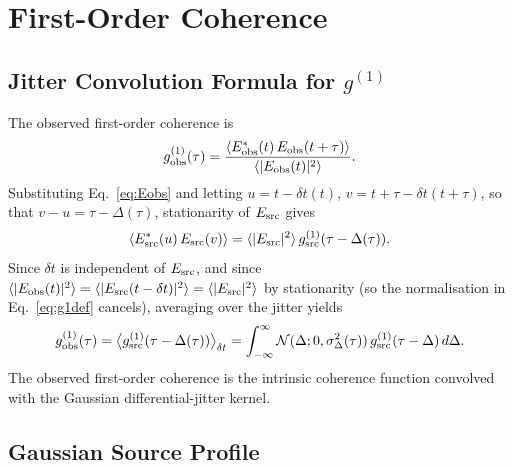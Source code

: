 \documentclass[aps,prd,onecolumn,amsmath,amssymb]{revtex4-2}
\begin{document}
\section{First-Order Coherence }
\label{sec:g1}

\subsection{Jitter Convolution Formula for $g^{(1)}$}

The observed first-order coherence is
\begin{equation}
  g^{(1)}_{\rm obs}(\tau) = \frac{\langle E^*_{\rm obs}(t)\,E_{\rm obs}(t+\tau)\rangle}
                                  {\langle|E_{\rm obs}(t)|^2\rangle}.
  \label{eq:g1def}
\end{equation}
Substituting Eq.~\eqref{eq:Eobs} and letting
$u = t - \delta t(t)$, $v = t+\tau - \delta t(t+\tau)$, so that
$v - u = \tau - \Delta(\tau)$, stationarity of $E_{\rm src}$ gives
\begin{equation}
  \langle E^*_{\rm src}(u)\,E_{\rm src}(v)\rangle
  = \langle|E_{\rm src}|^2\rangle\,g^{(1)}_{\rm src}(\tau - \Delta(\tau)).
\end{equation}
Since $\delta t$ is independent of $E_{\rm src}$, and since
$\langle|E_{\rm obs}(t)|^2\rangle = \langle|E_{\rm src}(t-\delta t)|^2\rangle
= \langle|E_{\rm src}|^2\rangle$ by stationarity (so the normalisation
in Eq.~\eqref{eq:g1def} cancels), averaging over the jitter yields
\begin{equation}
  g^{(1)}_{\rm obs}(\tau)
    = \big\langle g^{(1)}_{\rm src}(\tau - \Delta(\tau))\big\rangle_{\delta t}
    = \int_{-\infty}^{\infty} \mathcal{N}(\Delta;0,\sigma_\Delta^2(\tau))\,
      g^{(1)}_{\rm src}(\tau - \Delta)\,d\Delta.
  \label{eq:g1obs}
\end{equation}
The observed first-order coherence is the intrinsic coherence function
convolved with the Gaussian differential-jitter kernel.

\subsection{Gaussian Source Profile}
\label{sec:closedforms}
\end{document}
